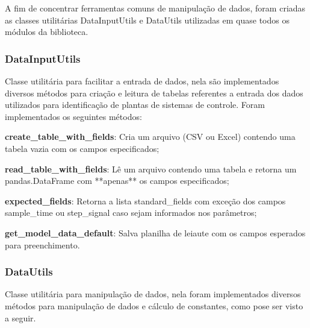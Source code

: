 A fim de concentrar ferramentas comuns de manipulação de dados, foram criadas as classes utilitárias DataInputUtils e
DataUtils utilizadas em quase todos os módulos da biblioteca.

\subsubsection{DataInputUtils}
Classe utilitária para facilitar a entrada de dados, nela são implementados diversos métodos para criação e leitura de
tabelas referentes a entrada dos dados utilizados para identificação de plantas de sistemas de controle.
Foram implementados os seguintes métodos:

\begin{alineas}
    \item \textbf{create\_table\_with\_fields}: Cria um arquivo (CSV ou Excel) contendo uma tabela vazia com os campos
    especificados;
    \item \textbf{read\_table\_with\_fields}: Lê um arquivo contendo uma tabela e retorna um
    pandas.DataFrame com **apenas** os campos especificados;
    \item \textbf{expected\_fields}: Retorna a lista standard\_fields com exceção dos campos sample\_time ou
    step\_signal caso sejam informados nos parâmetros;
    \item \textbf{get\_model\_data\_default}: Salva planilha de leiaute com os campos esperados para preenchimento.
\end{alineas}

\subsubsection{DataUtils}

Classe utilitária para manipulação de dados, nela foram implementados diversos métodos para manipulação de dados e
cálculo de constantes, como pose ser visto a seguir.


